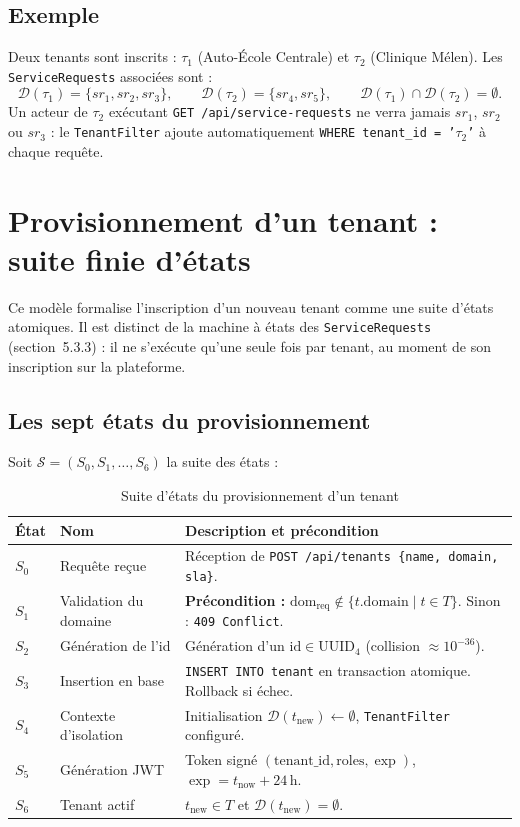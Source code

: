 \subsection{Exemple}

Deux tenants sont inscrits : $\tau_1$ (Auto-École Centrale) et
$\tau_2$ (Clinique Mélen). Les \texttt{ServiceRequests} associées sont :
\[
\mathcal{D}(\tau_1) = \{sr_1, sr_2, sr_3\},
\qquad
\mathcal{D}(\tau_2) = \{sr_4, sr_5\},
\qquad
\mathcal{D}(\tau_1) \cap \mathcal{D}(\tau_2) = \emptyset.
\]
Un acteur de $\tau_2$ exécutant \texttt{GET /api/service-requests} ne
verra jamais $sr_1$, $sr_2$ ou $sr_3$ : le \texttt{TenantFilter} ajoute
automatiquement \texttt{WHERE tenant\_id = '$\tau_2$'} à chaque requête.


\section{Provisionnement d'un tenant : suite finie d'états}

Ce modèle formalise l'inscription d'un nouveau tenant comme une suite
d'états atomiques. Il est distinct de la machine à états des
\texttt{ServiceRequests} (section~5.3.3) : il ne s'exécute qu'une seule
fois par tenant, au moment de son inscription sur la plateforme.

\subsection{Les sept états du provisionnement}

Soit $\mathcal{S} = (S_0, S_1, \ldots, S_6)$ la suite des états :

\begin{table}[H]
\centering
\caption{Suite d'états du provisionnement d'un tenant}
\label{tab:prov-states}
\renewcommand{\arraystretch}{1.2}\small
\begin{tabular}{lll}
\toprule
\textbf{État} & \textbf{Nom} & \textbf{Description et précondition} \\
\midrule
$S_0$ & Requête reçue
  & Réception de \texttt{POST /api/tenants \{name, domain, sla\}}. \\
$S_1$ & Validation du domaine
  & \textbf{Précondition :}
    $\text{dom}_{\text{req}} \notin \{t.\text{domain} \mid t \in T\}$.
    Sinon : \texttt{409 Conflict}. \\
$S_2$ & Génération de l'id
  & Génération d'un $\text{id} \in \text{UUID}_4$
    (collision $\approx 10^{-36}$). \\
$S_3$ & Insertion en base
  & \texttt{INSERT INTO tenant} en transaction atomique.
    Rollback si échec. \\
$S_4$ & Contexte d'isolation
  & Initialisation $\mathcal{D}(t_{\text{new}}) \leftarrow \emptyset$,
    \texttt{TenantFilter} configuré. \\
$S_5$ & Génération JWT
  & Token signé $(\text{tenant\_id}, \text{roles}, \exp)$,
    $\exp = t_{\text{now}} + 24\,\text{h}$. \\
$S_6$ & Tenant actif
  & $t_{\text{new}} \in T$ et
    $\mathcal{D}(t_{\text{new}}) = \emptyset$. \\
\bottomrule
\end{tabular}
\end{table}

